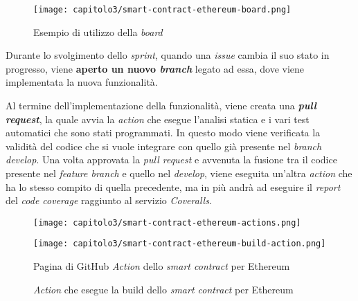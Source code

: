 \begin{figure}[h!]
  \centering
  \texttt{[image: capitolo3/smart-contract-ethereum-board.png]}
  \caption{Esempio di utilizzo della \textit{board}}
\end{figure}

Durante lo svolgimento dello \textit{sprint}, quando una \textit{issue} cambia il suo stato in progresso, viene \textbf{aperto un nuovo \textit{branch}} legato ad essa, dove viene implementata la nuova funzionalità.

Al termine dell'implementazione della funzionalità, viene creata una \textbf{\textit{pull request}}, la quale avvia la \textit{action} che esegue l'analisi statica e i vari test automatici che sono stati programmati. In questo modo viene verificata la validità del codice che si vuole integrare con quello già presente nel \textit{branch develop}. Una volta approvata la \textit{pull request} e avvenuta la fusione tra il codice presente nel \textit{feature branch} e quello nel \textit{develop}, viene eseguita un'altra \textit{action} che ha lo stesso compito di quella precedente, ma in più andrà ad eseguire il \textit{report} del \textit{code coverage} raggiunto al servizio \textit{Coveralls}.

\clearpage

\begin{figure}[tbph!]
  \captionsetup{singlelinecheck = false, format= hang, justification=raggedright, font=footnotesize, labelsep=space}
  
  \centering

  \begin{minipage}{0.705\textwidth}
    \texttt{[image: capitolo3/smart-contract-ethereum-actions.png]}
  \end{minipage}%
  \hspace{0.1cm}%
  \begin{minipage}{0.285\textwidth}
    \texttt{[image: capitolo3/smart-contract-ethereum-build-action.png]}
  \end{minipage}

  \begin{minipage}[t]{0.705\textwidth}
    \caption{Pagina di GitHub \textit{Action} dello \textit{smart contract} per Ethereum}
  \end{minipage}%
  \hspace{0.1cm}%
  \begin{minipage}[t]{0.285\textwidth}
    \caption{\textit{Action} che esegue la build dello \textit{smart contract} per Ethereum}
  \end{minipage}
\end{figure}

